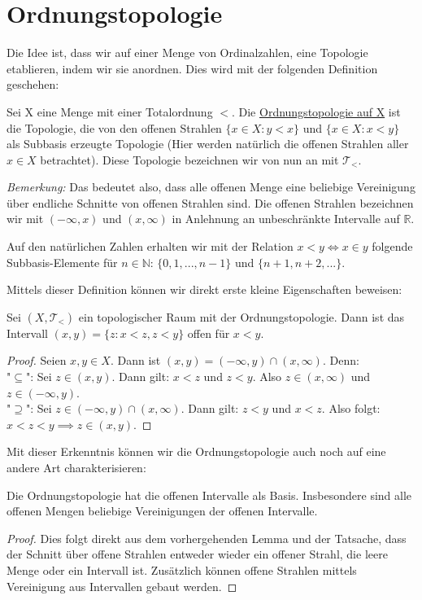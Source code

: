 \documentclass[11pt]{scrartcl}
\newcommand{\R}{\mathbb{R}}
\newcommand{\N}{\mathbb{N}}
\begin{document}
\section{Ordnungstopologie}
Die Idee ist, dass wir auf einer Menge von Ordinalzahlen, eine Topologie etablieren, indem wir sie anordnen. Dies wird mit der folgenden Definition geschehen:
\begin{definition}
Sei X eine Menge mit einer Totalordnung $<$. Die \underline{Ordnungstopologie auf X} ist die Topologie, die von den offenen Strahlen $\{ x\in X: y < x\}$ und $\{ x\in X: x<y\}$ als Subbasis erzeugte Topologie (Hier werden natürlich die offenen Strahlen aller $x\in X$ betrachtet). Diese Topologie bezeichnen wir von nun an mit $\mathcal T_{<}$.
\end{definition}
\noindent \textit{Bemerkung:} Das bedeutet also, dass alle offenen Menge eine beliebige Vereinigung über endliche Schnitte von offenen Strahlen sind. Die offenen Strahlen bezeichnen wir mit $(-\infty,x)$ und $(x,\infty)$ in Anlehnung an unbeschränkte Intervalle auf $\R$.
\begin{example}
	Auf den natürlichen Zahlen erhalten wir mit der Relation $x<y \iff x\in y$ folgende Subbasis-Elemente für $n\in\N$: $\{ 0,1,...,n-1\}$ und $\{n+1, n+2,...\}$.
\end{example}
Mittels dieser Definition können wir direkt erste kleine Eigenschaften beweisen:
\begin{lemma}
Sei $(X, \mathcal T_{<})$ ein topologischer Raum mit der Ordnungstopologie. Dann ist das Intervall $(x,y)=\{ z: x < z, z < y\}$ offen für $x<y$.
\end{lemma}
\begin{proof}
	Seien $x,y\in X$. Dann ist $(x,y)=(-\infty,y)\cap (x,\infty)$. Denn:\\
	"$\subseteq$": Sei $z\in (x,y)$. Dann gilt: $x < z$ und $z < y$. Also $z\in (x,\infty)$ und $z\in (-\infty,y)$. \\
	"$\supseteq$": Sei $z\in (-\infty,y)\cap (x,\infty)$. Dann gilt: $z < y$ und $x<z$. Also folgt: $x<z<y\implies z\in (x,y)$.
\end{proof}
Mit dieser Erkenntnis können wir die Ordnungstopologie auch noch auf eine andere Art charakterisieren:
\begin{corollary}
	Die Ordnungstopologie hat die offenen Intervalle als Basis. Insbesondere sind alle offenen Mengen beliebige Vereinigungen der offenen Intervalle.
\end{corollary}
\begin{proof}
	Dies folgt direkt aus dem vorhergehenden Lemma und der Tatsache, dass der Schnitt über offene Strahlen entweder wieder ein offener Strahl, die leere Menge oder ein Intervall ist. Zusätzlich können offene Strahlen mittels Vereinigung aus Intervallen gebaut werden. 
\end{proof}
\end{document}
